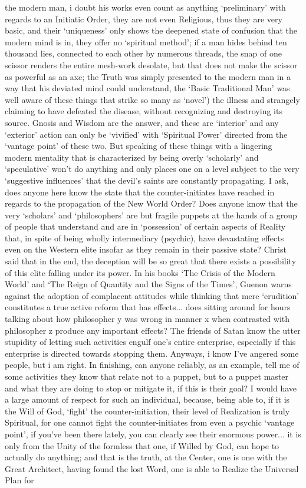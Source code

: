 \begin{footnotesize}
\begin{sffamily}
the modern man, i doubt his works even count as anything `preliminary' with regards to an Initiatic Order, they are not even Religious, thus they are very basic, and their `uniqueness' only shows the deepened state of confusion that the modern mind is in, they offer no `spiritual method'; if a man hides behind ten thousand lies, connected to each other by numerous threads, the snap of one scissor renders the entire mesh-work desolate, but that does not make the scissor as powerful as an axe; the Truth was simply presented to the modern man in a way that his deviated mind could understand, the `Basic Traditional Man' was well aware of these things that strike so many as `novel') the illness and strangely claiming to have defeated the disease, without recognizing and destroying its source. Gnosis and Wisdom are the answer, and these are `interior' and any `exterior' action can only be `vivified' with `Spiritual Power' directed from the `vantage point' of these two. But speaking of these things with a lingering modern mentality that is characterized by being overly `scholarly' and `speculative' won't do anything and only places one on a level subject to the very `suggestive influences' that the devil's saints are constantly propagating. I ask, does anyone here know the state that the counter-initiates have reached in regards to the propagation of the New World Order? Does anyone know that the very `scholars' and `philosophers' are but fragile puppets at the hands of a group of people that understand and are in `possession' of certain aspects of Reality that, in spite of being wholly intermediary (psychic), have devastating effects even on the Western elite insofar as they remain in their passive state? Christ said that in the end, the deception will be so great that there exists a possibility of this elite falling under its power. In his books `The Crisis of the Modern World' and `The Reign of Quantity and the Signs of the Times', Guenon warns against the adoption of complacent attitudes while thinking that mere `erudition' constitutes a true active reform that has effects... does sitting around for hours talking about how philosopher y was wrong in manner x when contrasted with philosopher z produce any important effects? The friends of Satan know the utter stupidity of letting such activities engulf one's entire enterprise, especially if this enterprise is directed towards stopping them. Anyways, i know I've angered some people, but i am right. In finishing, can anyone reliably, as an example, tell me of some activities they know that relate not to a puppet, but to a puppet master and what they are doing to stop or mitigate it, if this is their goal? I would have a large amount of respect for such an individual, because, being able to, if it is the Will of God, `fight' the counter-initiation, their level of Realization is truly Spiritual, for one cannot fight the counter-initiates from even a psychic `vantage point', if you've been there lately, you can clearly see their enormous power... it is only from the Unity of the formless that one, if Willed by God, can hope to actually do anything; and that is the truth, at the Center, one is one with the Great Architect, having found the lost Word, one is able to Realize the Universal Plan for 
\end{sffamily}
\end{footnotesize}
